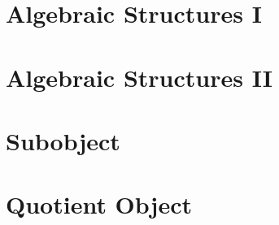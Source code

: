 \section{Algebraic Structures I}








\section{Algebraic Structures II}







\section{Subobject}







\section{Quotient Object}




